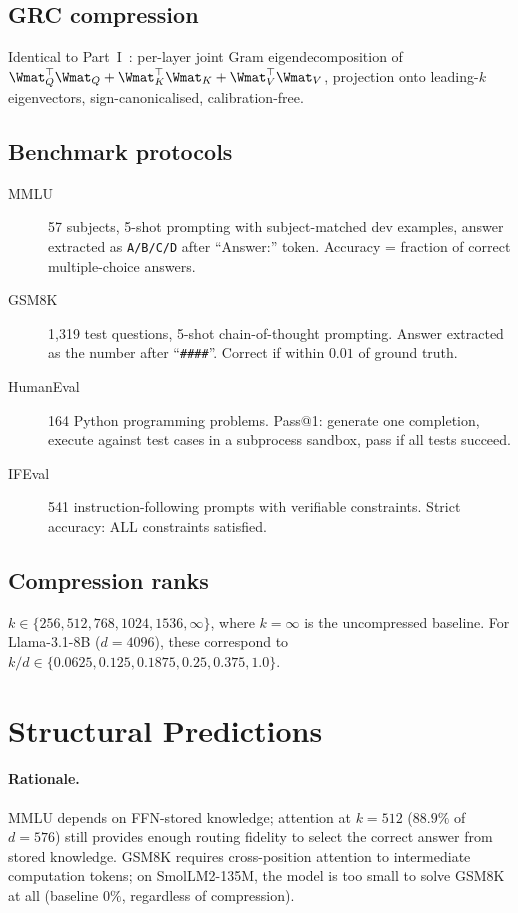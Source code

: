 \documentclass[11pt]{article}
\begin{document}
\subsection{GRC compression}
Identical to Part~I~\cite{stewart2026grc}: per-layer joint Gram
eigendecomposition of $\Wmat_Q^\top\Wmat_Q+\Wmat_K^\top\Wmat_K+
\Wmat_V^\top\Wmat_V$, projection onto leading-$k$ eigenvectors,
sign-canonicalised, calibration-free.

\subsection{Benchmark protocols}

\begin{description}
\item[MMLU] 57 subjects, 5-shot prompting with subject-matched dev
      examples, answer extracted as \texttt{A/B/C/D} after ``Answer:''
      token.  Accuracy = fraction of correct multiple-choice answers.

\item[GSM8K] 1,319 test questions, 5-shot chain-of-thought prompting.
      Answer extracted as the number after ``\texttt{\#\#\#\#}''.
      Correct if within $0.01$ of ground truth.

\item[HumanEval] 164 Python programming problems.  Pass@1: generate one
      completion, execute against test cases in a subprocess sandbox,
      pass if all tests succeed.

\item[IFEval] 541 instruction-following prompts with verifiable
      constraints.  Strict accuracy: ALL constraints satisfied.
\end{description}

\subsection{Compression ranks}
$k\in\{256,512,768,1024,1536,\infty\}$, where $k{=}\infty$ is the
uncompressed baseline.  For Llama-3.1-8B ($d{=}4096$), these correspond
to $k/d\in\{0.0625,0.125,0.1875,0.25,0.375,1.0\}$.

\section{Structural Predictions}
\label{sec:predictions}

\paragraph{Rationale.}  MMLU depends on FFN-stored knowledge; attention
at $k{=}512$ ($88.9\%$ of $d{=}576$) still provides enough routing fidelity
to select the correct answer from stored knowledge.  GSM8K requires
cross-position attention to intermediate computation tokens; on
SmolLM2-135M, the model is too small to solve GSM8K at all
(baseline $0\%$, regardless of compression).
\end{document}
